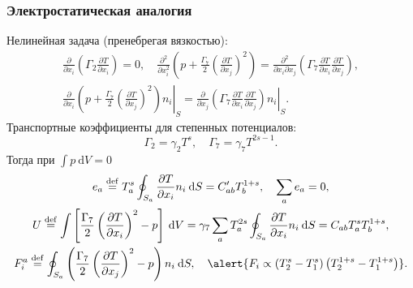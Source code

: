 \documentclass[mathserif]{beamer} %
\newcommand{\eqdef}{\overset{\mathrm{def}}{=}}
\newcommand{\dd}{\:\mathrm{d}}
\newcommand{\pder}[2][]{\frac{\partial#1}{\partial#2}}
\newcommand{\pderdual}[2][]{\frac{\partial^2#1}{\partial#2^2}}
\newcommand{\pderder}[3][]{\frac{\partial^2#1}{\partial#2\partial#3}}
\begin{document}
\begin{frame}
    \frametitle{Электростатическая аналогия}
    \footnotesize
    Нелинейная задача (пренебрегая вязкостью):
    \begin{gather*}
        \pder{x_i}\left( \Gamma_2 \pder[T]{x_i} \right) = 0, \quad
        \pderdual{x_i}\left( p + \frac{\Gamma_7}{2}\left(\pder[T]{x_j}\right)^2 \right) =
        \pderder{x_i}{x_j}\left( \Gamma_7\pder[T]{x_i}\pder[T]{x_j} \right), \\
        \pder{x_i}\left.\left( p + \frac{\Gamma_7}{2}\left(\pder[T]{x_j}\right)^2 \right)n_i\right|_S =
        \pder{x_j}\left.\left( \Gamma_7\pder[T]{x_i}\pder[T]{x_j} \right)n_i\right|_S.
    \end{gather*}
    Транспортные коэффициенты для степенных потенциалов:
    \begin{equation*}\label{eq:gammas}
        \Gamma_2 = \gamma_2 T^s, \quad \Gamma_7 = \gamma_7 T^{2s-1}.
    \end{equation*}
    Тогда при \(\int p\dd{V} = 0\)
    \begin{gather*}
        e_a \eqdef T_a^s \oint_{S_a} \pder[T]{x_i}n_i\dd{S} = C'_{ab} T_b^{1+s}, \quad \sum_a e_a = 0, \\
        U \eqdef \int \left[ \frac{\Gamma_7}2\left(\pder[T]{x_i}\right)^2 - p \right]\dd{V} =
        \gamma_7 \sum_a T_a^{2s} \oint_{S_a} \pder[T]{x_i}n_i\dd{S} = C_{ab} T_a^s T_b^{1+s}, \\
        F^a_i \eqdef \oint_{S_a} \left( \frac{\Gamma_7}{2}\left(\pder[T]{x_j}\right)^2 - p \right) n_i\dd{S}, \quad
        \alert{F_i \propto \left( T_2^s - T_1^s \right)\left( T_2^{1+s} - T_1^{1+s} \right)}. %
    \end{gather*}
\end{frame}
\end{document}
